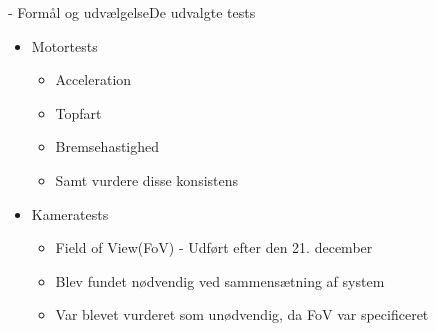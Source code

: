\begin{frame}[fragile]{\insertsection - Formål og udvælgelse}{De udvalgte tests}
 \begin{itemize}
  \item Motortests
  \begin{itemize}
      \item Acceleration
      \item Topfart
      \item Bremsehastighed
      \item Samt vurdere disse konsistens
  \end{itemize}
  \item Kameratests
  \begin{itemize}
      \item Field of View(FoV) - Udført efter den 21. december
      \item Blev fundet nødvendig ved sammensætning af system
      \item Var blevet vurderet som unødvendig, da FoV var specificeret
  \end{itemize}
 \end{itemize}
\end{frame}